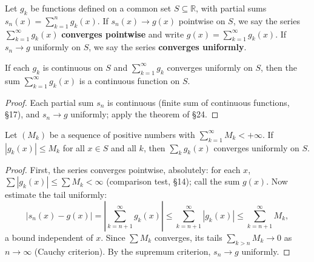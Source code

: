 \documentclass[11pt]{report}
\begin{document}
\begin{defbox}
Let $g_k$ be functions defined on a common set $S \subseteq \mathbb{R}$, with partial sums $s_n(x) = \sum_{k=1}^n g_k(x)$. If $s_n(x) \to g(x)$ pointwise on $S$, we say the series $\sum_{k=1}^\infty g_k(x)$ \textbf{converges pointwise} and write $g(x) = \sum_{k=1}^\infty g_k(x)$. If $s_n \to g$ uniformly on $S$, we say the series \textbf{converges uniformly}.
\end{defbox}

\begin{thmbox}
If each $g_k$ is continuous on $S$ and $\sum_{k=1}^\infty g_k$ converges uniformly on $S$, then the sum $\sum_{k=1}^\infty g_k(x)$ is a continuous function on $S$.
\end{thmbox}

\begin{proof}
Each partial sum $s_n$ is continuous (finite sum of continuous functions, \S 17), and $s_n \to g$ uniformly; apply the theorem of \S 24.
\end{proof}

\begin{thmbox}
Let $(M_k)$ be a sequence of positive numbers with $\sum_{k=1}^\infty M_k < +\infty$. If $|g_k(x)| \leq M_k$ for all $x \in S$ and all $k$, then $\sum_k g_k(x)$ converges uniformly on $S$.
\end{thmbox}

\begin{proof}
First, the series converges pointwise, absolutely: for each $x$, $\sum |g_k(x)| \leq \sum M_k < \infty$ (comparison test, \S 14); call the sum $g(x)$. Now estimate the tail uniformly:
\[
\left| s_n(x) - g(x) \right| = \left| \sum_{k=n+1}^{\infty} g_k(x) \right| \leq \sum_{k=n+1}^\infty |g_k(x)| \leq \sum_{k=n+1}^\infty M_k,
\]
a bound independent of $x$. Since $\sum M_k$ converges, its tails $\sum_{k > n} M_k \to 0$ as $n \to \infty$ (Cauchy criterion). By the supremum criterion, $s_n \to g$ uniformly.
\end{proof}
\end{document}
